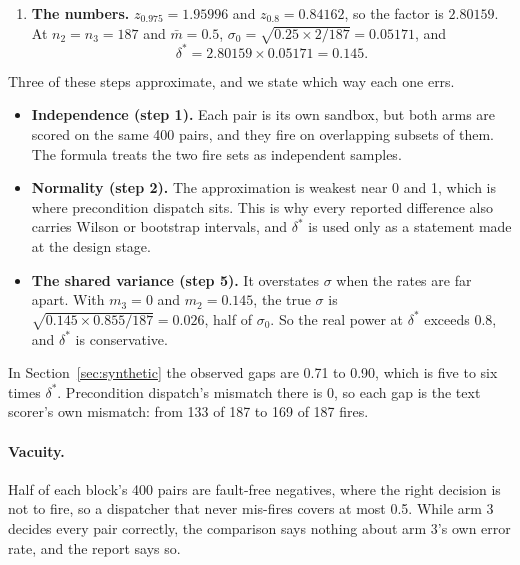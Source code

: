 \documentclass[11pt]{article}
\begin{document}
\begin{enumerate}
  $\tfrac14$. Using $\bar m=0.5$ therefore gives the largest $\delta^\ast$ for given fire counts,
  a statement of sensitivity that a low observed rate cannot flatter. On replicate 1 the
  observed pooled rate is $148/374=0.396$ (lexical similarity's 148 wrong of 187 fires and
  precondition dispatch's 0 of 187), which would give $0.142$.
  \item \textbf{The numbers.} $z_{0.975}=1.95996$ and $z_{0.8}=0.84162$, so the factor is
  $2.80159$. At $n_2=n_3=187$ and $\bar m=0.5$,
  $\sigma_0=\sqrt{0.25\times 2/187}=0.05171$, and
  \[
    \delta^\ast=2.80159\times0.05171=0.145.
  \]
\end{enumerate}

Three of these steps approximate, and we state which way each one errs.
\begin{itemize}
  \item \textbf{Independence (step 1).} Each pair is its own sandbox, but both arms are scored on
  the same 400 pairs, and they fire on overlapping subsets of them. The formula treats the two
  fire sets as independent samples.
  \item \textbf{Normality (step 2).} The approximation is weakest near 0 and 1, which is where
  precondition dispatch sits. This is why every reported difference also carries Wilson or
  bootstrap intervals, and $\delta^\ast$ is used only as a statement made at the design stage.
  \item \textbf{The shared variance (step 5).} It overstates $\sigma$ when the rates are far
  apart. With $m_3=0$ and $m_2=0.145$, the true $\sigma$ is
  $\sqrt{0.145\times0.855/187}=0.026$, half of $\sigma_0$. So the real power at $\delta^\ast$
  exceeds 0.8, and $\delta^\ast$ is conservative.
\end{itemize}
In Section~\ref{sec:synthetic} the observed gaps are 0.71 to 0.90, which is five to six times
$\delta^\ast$. Precondition dispatch's mismatch there is 0, so each gap is the text scorer's own
mismatch: from 133 of 187 to 169 of 187 fires.

\paragraph{Vacuity.}
Half of each block's 400 pairs are fault-free negatives, where the right decision is not to fire,
so a dispatcher that never mis-fires covers at most 0.5. While arm 3 decides every pair
correctly, the comparison says nothing about arm 3's own error rate, and the report says so.
\end{document}
